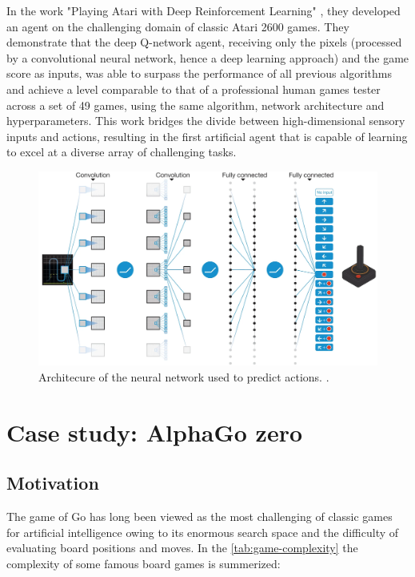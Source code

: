 \documentclass{article}
\begin{document}
In the work "Playing Atari with Deep Reinforcement Learning" \cite{mnih2013atari}, they developed an agent on the challenging domain of classic Atari 2600 games. They demonstrate that the deep Q-network agent, receiving only the pixels (processed by a convolutional neural network, hence a deep learning approach) and the game score as inputs, was able to surpass the performance of all previous algorithms and achieve a level comparable to that of a professional human games tester across a set of 49 games, using the same algorithm, network architecture and hyperparameters. This work bridges the divide between high-dimensional sensory inputs and actions, resulting in the first artificial agent that is capable of learning to excel at a diverse array of challenging tasks.

\begin{figure}[h]
	\centering
	\includegraphics[width=14cm]{dqn-architecture.png}
	\caption{Architecure of the neural network used to predict actions. \cite{mnih2013atari}.}
	\label{fig:dqn-architecture.png}
\end{figure}



\section{Case study: AlphaGo zero}
\subsection{Motivation}
The game of Go has long been viewed as the most challenging of classic games for artificial intelligence owing to its enormous search space and the difficulty of evaluating board positions and moves. In the \autoref{tab:game-complexity} the complexity of some famous board games is summerized:
\end{document}
